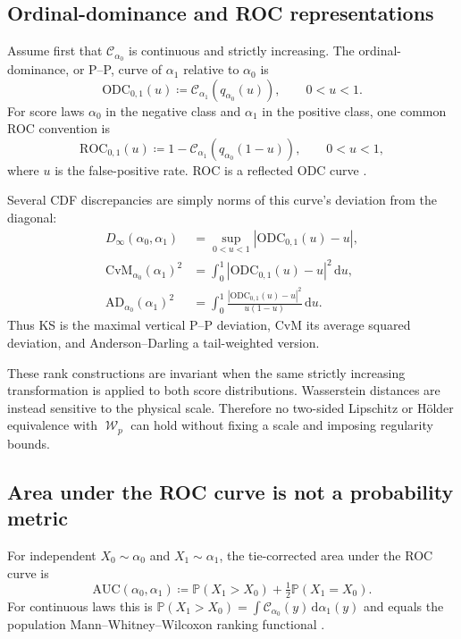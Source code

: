 \documentclass[11pt]{article}
\newcommand{\PP}{\mathbb P}
\renewcommand{\d}{\,\mathrm d}
\newcommand{\al}{\alpha}
\newcommand{\Cc}{\mathcal C}
\newcommand{\cumul}[1]{\Cc_{#1}}
\DeclareMathOperator{\Wass}{\mathcal W}
\newcommand{\eqdef}{\coloneqq}
\newcommand{\AUC}{\mathrm{AUC}}
\newcommand{\ROC}{\mathrm{ROC}}
\begin{document}
\subsection{Ordinal-dominance and ROC representations}

Assume first that $\cumul{\al_0}$ is continuous and strictly increasing.  The
ordinal-dominance, or P--P, curve of $\al_1$ relative to $\al_0$ is
\begin{equation}\label{eq:odc}
 \mathrm{ODC}_{0,1}(u)\eqdef\cumul{\al_1}(q_{\al_0}(u)),
 \qquad 0<u<1.
\end{equation}
For score laws $\al_0$ in the negative class and $\al_1$ in the positive
class, one common ROC convention is
\begin{equation}\label{eq:roc}
 \ROC_{0,1}(u)\eqdef 1-\cumul{\al_1}(q_{\al_0}(1-u)),
 \qquad 0<u<1,
\end{equation}
where $u$ is the false-positive rate.  ROC is a reflected ODC curve
\cite{Bamber1975,GneitingVogel2022}.

Several CDF discrepancies are simply norms of this curve's deviation from the
diagonal:
\begin{align}\label{eq:rank-discrepancies}
 D_\infty(\al_0,\al_1)
 &=\sup_{0<u<1}|\mathrm{ODC}_{0,1}(u)-u|,\\
 \mathrm{CvM}_{\al_0}(\al_1)^2
 &=\int_0^1|\mathrm{ODC}_{0,1}(u)-u|^2\d u,\\
 \mathrm{AD}_{\al_0}(\al_1)^2
 &=\int_0^1\frac{|\mathrm{ODC}_{0,1}(u)-u|^2}{u(1-u)}\d u.
\end{align}
Thus KS is the maximal vertical P--P deviation, CvM its average squared
deviation, and Anderson--Darling a tail-weighted version.

These rank constructions are invariant when the same strictly increasing
transformation is applied to both score distributions.  Wasserstein distances
are instead sensitive to the physical scale.  Therefore no two-sided
Lipschitz or H\"older equivalence with $\Wass_p$ can hold without fixing a scale
and imposing regularity bounds.

\subsection{Area under the ROC curve is not a probability metric}

For independent $X_0\sim\al_0$ and $X_1\sim\al_1$, the tie-corrected
area under the ROC curve is
\begin{equation}\label{eq:auc}
 \AUC(\al_0,\al_1)
 \eqdef\PP(X_1>X_0)+\tfrac12\PP(X_1=X_0).
\end{equation}
For continuous laws this is
$\PP(X_1>X_0)=\int \cumul{\al_0}(y)\d\al_1(y)$ and equals
the population Mann--Whitney--Wilcoxon ranking functional
\cite{MannWhitney1947,Bamber1975}.
\end{document}
